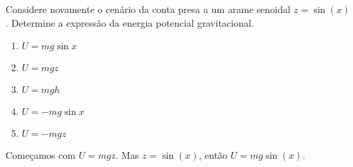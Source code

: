 \begin{question}
    Considere novamente o cenário da conta presa a um arame senoidal $z = \sin(x)$.
    Determine a expressão da energia potencial gravitacional.
    \begin{enumerate}
      \item $U = mg\sin x$ \rightanswer
      \item $U = mgz$
      \item $U = mgh$
      \item $U = -mg\sin x$
      \item $U = -mgz$
    \end{enumerate}

    \begin{solution}
      Começamos com $U = mgz$.
      Mas $z = \sin(x)$, então $U = mg\sin(x)$.
    \end{solution}
\end{question}